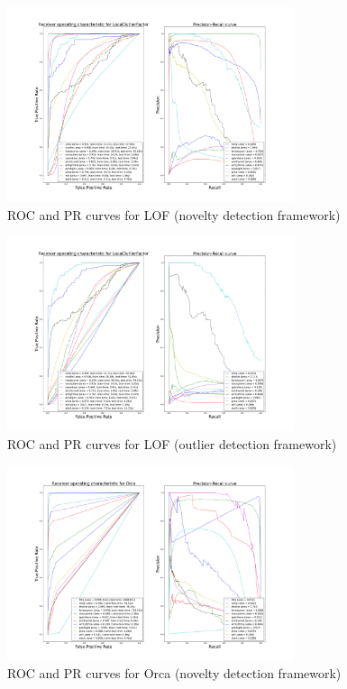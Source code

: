 \begin{figure}[!ht]
    \caption{\acs{ROC} and \acs{PR} curves for \acs{LOF} (novelty detection
    framework)}
    \label{ocrf:fig:lof_roc_pr}
    \centering
    \includegraphics[trim=175 80 175 123, clip,
    width=0.75\textwidth]{./gfx/bench_lof_roc_pr_supervised_factorized.png}
\end{figure}
\begin{figure}[!ht]
    \caption{\acs{ROC} and \acs{PR} curves for \acs{LOF} (outlier detection
    framework)}
    \label{ocrf:fig:lof_roc_pr_unsupervised}
    \centering
    \includegraphics[trim=175 80 175 123, clip,
    width=0.75\textwidth]{./gfx/bench_lof_roc_pr_unsupervised_factorized.png}
\end{figure}
\begin{figure}[!ht]
    \caption{\acs{ROC} and \acs{PR} curves for Orca (novelty detection
    framework)}
    \label{ocrf:fig:orca_roc_pr}
    \centering
    \includegraphics[trim=175 80 175 123, clip,
    width=0.75\textwidth]{./gfx/bench_orca_roc_pr_supervised_factorized.png}
\end{figure}
